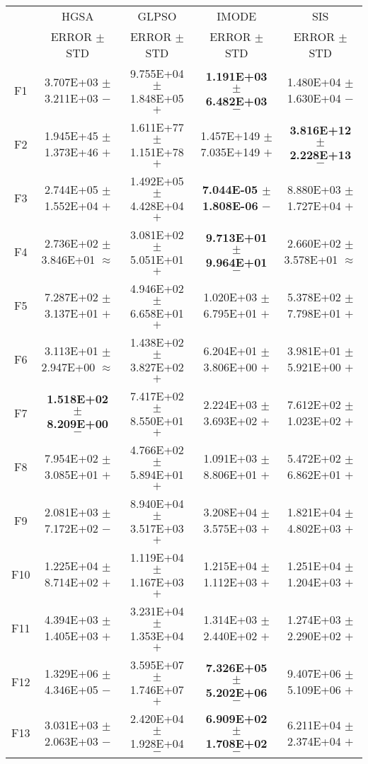 \documentclass[paper]{ieice}
\begin{document}
\begin{table*}[htbp]
\begin{tabular}{c|c|c|c|c}
		&	HGSA				&	GLPSO				&	IMODE				&	SIS				\\   \cline{2-5}
		&	ERROR	$\pm$	STD		&	ERROR	$\pm$	STD		&	ERROR	$\pm$	STD		&	ERROR	$\pm$	STD		\\ \hline
		F1	&	3.707E+03	$\pm$	3.211E+03	$-$	&	9.755E+04	$\pm$	1.848E+05	$+$	&		\textbf{1.191E+03	$\pm$	6.482E+03}	$-$	&	1.480E+04	$\pm$	1.630E+04	$-$	\\
		F2	&	1.945E+45	$\pm$	1.373E+46	$+$	&	1.611E+77	$\pm$	1.151E+78	$+$	&	1.457E+149	$\pm$	7.035E+149	$+$	&	\textbf{3.816E+12	$\pm$	2.228E+13}	$-$	\\
		F3	&	2.744E+05	$\pm$	1.552E+04	$+$	&	1.492E+05	$\pm$	4.428E+04	$+$	&	\textbf{7.044E-05	$\pm$	1.808E-06}	$-$	&	8.880E+03	$\pm$	1.727E+04	$+$	\\
		F4	&	2.736E+02	$\pm$	3.846E+01	$\approx$	&	3.081E+02	$\pm$	5.051E+01	$+$	&	\textbf{9.713E+01	$\pm$	9.964E+01}	$-$	&	2.660E+02	$\pm$	3.578E+01	$\approx$	\\
		F5	&	7.287E+02	$\pm$	3.137E+01	$+$	&	4.946E+02	$\pm$	6.658E+01	$+$	&	1.020E+03	$\pm$	6.795E+01	$+$	&	5.378E+02	$\pm$	7.798E+01	$+$	\\
		F6	&	3.113E+01	$\pm$	2.947E+00	$\approx$	&	1.438E+02	$\pm$	3.827E+02	$+$	&	6.204E+01	$\pm$	3.806E+00	$+$	&	3.981E+01	$\pm$	5.921E+00	$+$	\\
		F7	&	\textbf{1.518E+02	$\pm$	8.209E+00}	$-$	&	7.417E+02	$\pm$	8.550E+01	$+$	&	2.224E+03	$\pm$	3.693E+02	$+$	&	7.612E+02	$\pm$	1.023E+02	$+$	\\
		F8	&	7.954E+02	$\pm$	3.085E+01	$+$	&	4.766E+02	$\pm$	5.894E+01	$+$	&	1.091E+03	$\pm$	8.806E+01	$+$	&	5.472E+02	$\pm$	6.862E+01	$+$	\\
		F9	&	2.081E+03	$\pm$	7.172E+02	$-$	&	8.940E+04	$\pm$	3.517E+03	$+$	&	3.208E+04	$\pm$	3.575E+03	$+$	&	1.821E+04	$\pm$	4.802E+03	$+$	\\
		F10	&	1.225E+04	$\pm$	8.714E+02	$+$	&	1.119E+04	$\pm$	1.167E+03	$+$	&	1.215E+04	$\pm$	1.112E+03	$+$	&	1.251E+04	$\pm$	1.204E+03	$+$	\\
		F11	&	4.394E+03	$\pm$	1.405E+03	$+$	&	3.231E+04	$\pm$	1.353E+04	$+$	&	1.314E+03	$\pm$	2.440E+02	$+$	&	1.274E+03	$\pm$	2.290E+02	$+$	\\
		F12	&	1.329E+06	$\pm$	4.346E+05	$-$	&	3.595E+07	$\pm$	1.746E+07	$+$	&	\textbf{7.326E+05	$\pm$	5.202E+06}	$-$	&	9.407E+06	$\pm$	5.109E+06	$+$	\\
		F13	&	3.031E+03	$\pm$	2.063E+03	$-$	&	2.420E+04	$\pm$	1.928E+04	$-$	&	\textbf{6.909E+02	$\pm$	1.708E+02}	$-$	&	6.211E+04	$\pm$	2.374E+04	$+$	\\

\end{tabular}
\end{table*}
\end{document}
